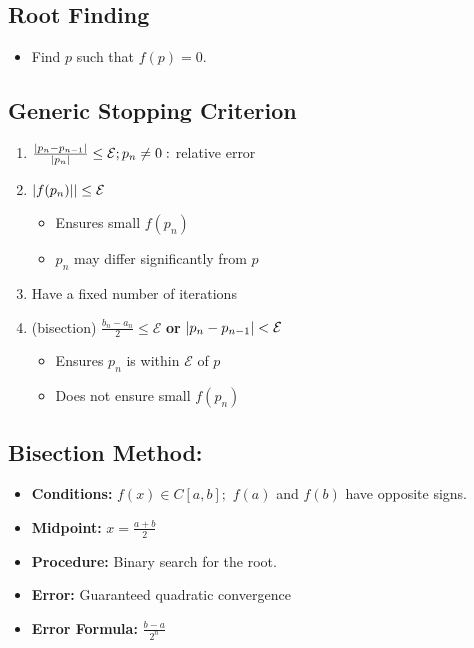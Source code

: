 \documentclass[8pt, letterpaper]{extarticle}
\newcommand{\bigEps}{\mathcal{E}}
\begin{document}
\begin{multicols*}{3}
  \section{Root Finding}
  \begin{itemize}
  \item Find $p$ such that $f(p) = 0$.
  \end{itemize}

  \subsection{Generic Stopping Criterion}
  \begin{enumerate}
    \item $\frac{\abs{p_n-p_{n-1}}}{\abs{p_n}} \leq \bigEps; p_n \neq 0:$
      relative error
    \item $\abs{f(p_n)|} \leq \bigEps$
      \begin{itemize}
        \item Ensures small $f(p_n)$
        \item $p_n$ may differ significantly from $p$
      \end{itemize}
    \item Have a fixed number of iterations
    \item (bisection) 
      $\frac{b_n-a_n}{2} \leq \bigEps$ \textbf{or} $\abs{p_n-p_{n-1}} <\bigEps$
      \begin{itemize}
        \item Ensures $p_n$ is within $\bigEps$ of  $p$
        \item Does not ensure small $f(p_n)$
      \end{itemize}
  \end{enumerate}

  \subsection{Bisection Method:}

  \begin{itemize}
    \item \textbf{Conditions:} $f(x) \in C[a,b];$ \newline
      $f(a)$ and $f(b)$ have opposite signs.
    \item \textbf{Midpoint:} $x = \frac{a+b}{2}$
    \item \textbf{Procedure:} Binary search for the root.
    \item \textbf{Error:} Guaranteed quadratic convergence 
    \item \textbf{Error Formula:} $\frac{b-a}{2^n}$
  \end{itemize}


\end{multicols*}
\end{document}
